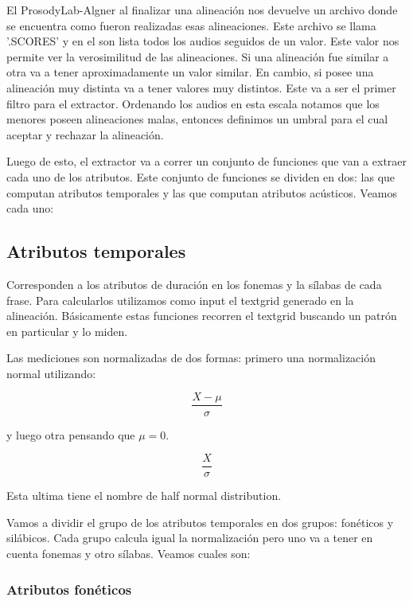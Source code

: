 \documentclass[11pt,a4paper,twoside]{tesis}
\begin{document}
El ProsodyLab-Algner al finalizar una alineación nos devuelve un archivo donde se encuentra como fueron realizadas esas alineaciones. Este archivo se llama '.SCORES' y en el son lista todos los audios seguidos de un valor. Este valor nos permite ver la verosimilitud de las alineaciones. Si una alineación fue similar a otra va a tener aproximadamente un valor similar. En cambio, si posee una alineación muy distinta va a tener valores muy distintos. Este va a ser el primer filtro para el extractor. Ordenando los audios en esta escala notamos que los menores poseen alineaciones malas, entonces definimos un umbral para el cual aceptar y rechazar la alineación.

Luego de esto, el extractor va a correr un conjunto de funciones que van a extraer cada uno de los atributos. Este conjunto de funciones se dividen en dos: las que computan atributos temporales y las que computan atributos acústicos. Veamos cada uno:

\subsection{Atributos temporales}

Corresponden a los atributos de duración en los fonemas y la sílabas de cada frase. Para calcularlos utilizamos como input el textgrid generado en la alineación. Básicamente estas funciones recorren el textgrid buscando un patrón en particular y lo miden.

Las mediciones son normalizadas de dos formas: primero una normalización normal utilizando:

\hspace{2cm} \[\frac{X - \mu }{ \sigma }\]

y luego otra pensando que $\mu = 0$. 

\hspace{2cm} \[\frac{X}{ \sigma }\]

Esta ultima tiene el nombre de half normal distribution.


Vamos a dividir el grupo de los atributos temporales en dos grupos: fonéticos y silábicos. Cada grupo calcula igual la normalización pero uno va a tener en cuenta fonemas y otro sílabas. Veamos cuales son:

\subsubsection{Atributos fonéticos}
\end{document}
